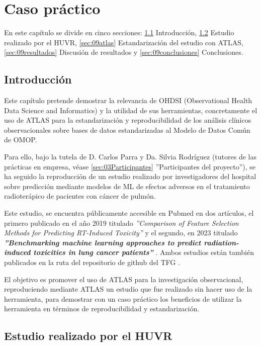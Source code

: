 \chapter{Caso práctico}\label{cap:09caso}
En este capítulo se divide en cinco secciones: \ref{sec:09intro} Introducción, \ref{sec:09huvr} Estudio realizado por el HUVR, \ref{sec:09atlas} Estandarización del estudio con ATLAS, \ref{sec:09resultados} Discusión de resultados y \ref{sec:09conclusiones} Conclusiones.

\section{Introducción} \label{sec:09intro}

Este capítulo pretende demostrar la relevancia de OHDSI (Observational Health Data Science and Informatics) y la utilidad de sus herramientas, concretamente el uso de ATLAS para la estandarización y reproducibilidad de los análisis clínicos observacionales sobre bases de datos estandarizadas al Modelo de Datos Común de OMOP. 

Para ello, bajo la tutela de D. Carlos Parra y Da. Silvia Rodríguez (tutores de las prácticas en empresa, véase \ref{sec:03Participantes} ''Participantes del proyecto''), se ha seguido la reproducción de un estudio realizado por investigadores del hospital sobre predicción mediante modelos de ML de efectos adversos en el tratamiento radioterápico de pacientes con cáncer de pulmón. 

Este estudio, se encuentra públicamente accesible en Pubmed en dos artículos, el primero publicado en el año 2019 titulado \textit{''Comparison of Feature Selection Methods for Predicting RT-Induced Toxicity'' }\cite{nunez2019comparison} y el segundo, en 2023 titulado \textbf{\textit{''Benchmarking machine learning approaches to predict radiation-induced toxicities in lung cancer patients''}} \cite{nunez2023benchmarking}. Ambos estudios están también publicados en la ruta  del repositorio de github del TFG \cite{vallealonsodc}.

El objetivo es promover el uso de ATLAS para la investigación observacional, reproduciendo mediante ATLAS un estudio que fue realizado sin hacer uso de la herramienta, para demostrar con un caso práctico los beneficios de utilizar la herramienta en términos de reproducibilidad y estandarización.

\section{Estudio realizado por el HUVR} \label{sec:09huvr}

